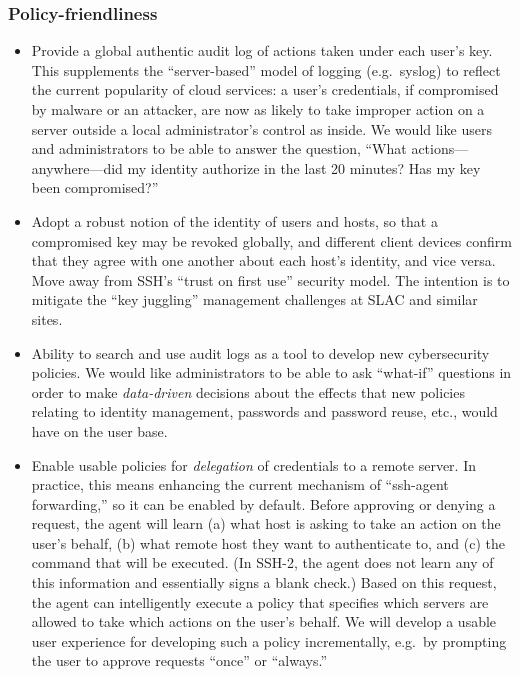 \documentclass[10pt]{article}
\begin{document}
\subsubsection{Policy-friendliness}
%
\begin{itemize}[topsep=0pt, itemsep=0pt]

\item Provide a global authentic audit log of actions taken under each
  user's key. This supplements the ``server-based'' model of logging
  (e.g.~syslog) to reflect the current popularity of cloud services: a
  user's credentials, if compromised by malware or an attacker, are
  now as likely to take improper action on a server outside a local
  administrator's control as inside. We would like users and
  administrators to be able to answer the question, ``What
  actions---anywhere---did my identity authorize in the last 20
  minutes? Has my key been compromised?''

\item Adopt a robust notion of the identity of users and hosts, so
  that a compromised key may be revoked globally, and different client
  devices confirm that they agree with one another about each host's
  identity, and vice versa. Move away from SSH's ``trust on first
  use'' security model. The intention is to mitigate the ``key
  juggling'' management challenges at SLAC and similar sites.

\item Ability to search and use audit logs as a tool to develop new
  cybersecurity policies. We would like administrators to be able to
  ask ``what-if'' questions in order to make \emph{data-driven}
  decisions about the effects that new policies relating to identity
  management, passwords and password reuse, etc., would have on the
  user base.

\item Enable usable policies for \emph{delegation} of credentials to a
  remote server. In practice, this means enhancing the current
  mechanism of ``ssh-agent forwarding,'' so it can be enabled by
  default. Before approving or denying a request, the agent will learn
  (a) what host is asking to take an action on the user's behalf, (b)
  what remote host they want to authenticate to, and (c) the command
  that will be executed. (In SSH-2, the agent does not learn any of
  this information and essentially signs a blank check.)  Based on
  this request, the agent can intelligently execute a policy that
  specifies which servers are allowed to take which actions on the
  user's behalf. We will develop a usable user experience for
  developing such a policy incrementally, e.g.~by prompting the
  user to approve requests ``once'' or ``always.''

\end{itemize}
\end{document}
